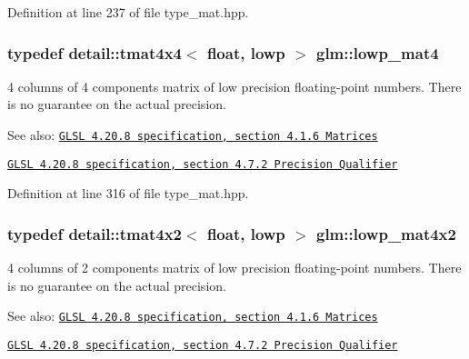 Definition at line 237 of file type\_\-mat.hpp.\hypertarget{group__core__precision_g8f6fef75ce51e9d6db7971478ad1f1c2}{
\subsubsection[lowp\_\-mat4]{\setlength{\rightskip}{0pt plus 5cm}typedef detail::tmat4x4$<$ float, lowp $>$ {\bf glm::lowp\_\-mat4}}}
\label{group__core__precision_g8f6fef75ce51e9d6db7971478ad1f1c2}


4 columns of 4 components matrix of low precision floating-point numbers. There is no guarantee on the actual precision.

\begin{Desc}
\item[See also:]\href{http://www.opengl.org/registry/doc/GLSLangSpec.4.20.8.pdf}{\tt GLSL 4.20.8 specification, section 4.1.6 Matrices} 

\href{http://www.opengl.org/registry/doc/GLSLangSpec.4.20.8.pdf}{\tt GLSL 4.20.8 specification, section 4.7.2 Precision Qualifier} \end{Desc}


Definition at line 316 of file type\_\-mat.hpp.\hypertarget{group__core__precision_g2cfe24ae14da17f3510acfc3d03e05a5}{
\subsubsection[lowp\_\-mat4x2]{\setlength{\rightskip}{0pt plus 5cm}typedef detail::tmat4x2$<$ float, lowp $>$ {\bf glm::lowp\_\-mat4x2}}}
\label{group__core__precision_g2cfe24ae14da17f3510acfc3d03e05a5}


4 columns of 2 components matrix of low precision floating-point numbers. There is no guarantee on the actual precision.

\begin{Desc}
\item[See also:]\href{http://www.opengl.org/registry/doc/GLSLangSpec.4.20.8.pdf}{\tt GLSL 4.20.8 specification, section 4.1.6 Matrices} 

\href{http://www.opengl.org/registry/doc/GLSLangSpec.4.20.8.pdf}{\tt GLSL 4.20.8 specification, section 4.7.2 Precision Qualifier} \end{Desc}


